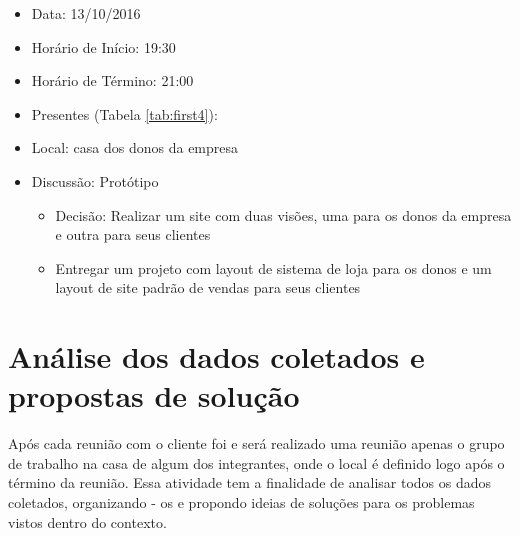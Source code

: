 \begin{itemize}
\item Data: 13/10/2016	
\item Horário de Início: 19:30	
\item Horário de Término: 21:00
\item Presentes (Tabela \ref{tab:first4}):
\begin{table}[!h]
\centering
\caption{Pessoas presentes na quarta reunião}
\label{tab:first4}
\end{table}
\item Local: casa dos donos da empresa
\item Discussão: Protótipo
\begin{itemize}
\item Decisão: Realizar um site com duas visões, uma para os donos da empresa e outra para seus clientes
\item Entregar um projeto com layout de sistema de loja para os donos e um layout de site padrão de vendas para seus clientes
\end{itemize}
\end{itemize}

\section{Análise dos dados coletados e propostas de solução}

Após cada reunião com o cliente foi e será realizado uma reunião apenas o grupo de trabalho na casa de algum dos integrantes, onde o local é definido logo após o término da reunião. Essa atividade tem a finalidade de analisar todos os dados coletados, organizando - os e propondo ideias de soluções para os problemas vistos dentro do contexto.
